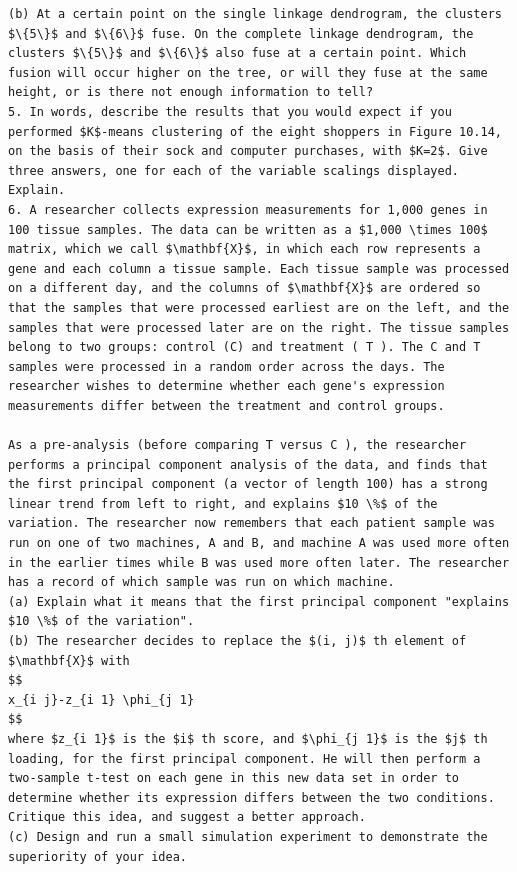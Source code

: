 \documentclass[10pt]{article}
\begin{document}
\begin{verbatim}
(b) At a certain point on the single linkage dendrogram, the clusters $\{5\}$ and $\{6\}$ fuse. On the complete linkage dendrogram, the clusters $\{5\}$ and $\{6\}$ also fuse at a certain point. Which fusion will occur higher on the tree, or will they fuse at the same height, or is there not enough information to tell?
5. In words, describe the results that you would expect if you performed $K$-means clustering of the eight shoppers in Figure 10.14, on the basis of their sock and computer purchases, with $K=2$. Give three answers, one for each of the variable scalings displayed. Explain.
6. A researcher collects expression measurements for 1,000 genes in 100 tissue samples. The data can be written as a $1,000 \times 100$ matrix, which we call $\mathbf{X}$, in which each row represents a gene and each column a tissue sample. Each tissue sample was processed on a different day, and the columns of $\mathbf{X}$ are ordered so that the samples that were processed earliest are on the left, and the samples that were processed later are on the right. The tissue samples belong to two groups: control (C) and treatment ( T ). The C and T samples were processed in a random order across the days. The researcher wishes to determine whether each gene's expression measurements differ between the treatment and control groups.

As a pre-analysis (before comparing T versus C ), the researcher performs a principal component analysis of the data, and finds that the first principal component (a vector of length 100) has a strong linear trend from left to right, and explains $10 \%$ of the variation. The researcher now remembers that each patient sample was run on one of two machines, A and B, and machine A was used more often in the earlier times while B was used more often later. The researcher has a record of which sample was run on which machine.
(a) Explain what it means that the first principal component "explains $10 \%$ of the variation".
(b) The researcher decides to replace the $(i, j)$ th element of $\mathbf{X}$ with
$$
x_{i j}-z_{i 1} \phi_{j 1}
$$
where $z_{i 1}$ is the $i$ th score, and $\phi_{j 1}$ is the $j$ th loading, for the first principal component. He will then perform a two-sample t-test on each gene in this new data set in order to determine whether its expression differs between the two conditions. Critique this idea, and suggest a better approach.
(c) Design and run a small simulation experiment to demonstrate the superiority of your idea.


\end{verbatim}
\end{document}
